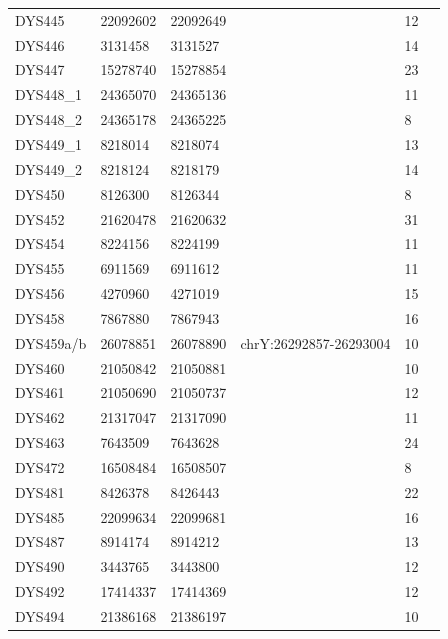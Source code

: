 \begin{tabularx}{\linewidth}{l l l l l l }
DYS445      & 22092602 & 22092649 &                        & 12 \\
DYS446      & 3131458  & 3131527  &                        & 14 \\
DYS447      & 15278740 & 15278854 &                        & 23 \\
DYS448\_1   & 24365070 & 24365136 &                        & 11 \\
DYS448\_2   & 24365178 & 24365225 &                        & 8  \\
DYS449\_1   & 8218014  & 8218074  &                        & 13 \\
DYS449\_2   & 8218124  & 8218179  &                        & 14 \\
DYS450      & 8126300  & 8126344  &                        & 8  \\
DYS452      & 21620478 & 21620632 &                        & 31 \\
DYS454      & 8224156  & 8224199  &                        & 11 \\
DYS455      & 6911569  & 6911612  &                        & 11 \\
DYS456      & 4270960  & 4271019  &                        & 15 \\
DYS458      & 7867880  & 7867943  &                        & 16 \\
DYS459a/b   & 26078851 & 26078890 & chrY:26292857-26293004 & 10 \\
DYS460      & 21050842 & 21050881 &                        & 10 \\
DYS461      & 21050690 & 21050737 &                        & 12 \\
DYS462      & 21317047 & 21317090 &                        & 11 \\
DYS463      & 7643509  & 7643628  &                        & 24 \\
DYS472      & 16508484 & 16508507 &                        & 8  \\
DYS481      & 8426378  & 8426443  &                        & 22 \\
DYS485      & 22099634 & 22099681 &                        & 16 \\
DYS487      & 8914174  & 8914212  &                        & 13 \\
DYS490      & 3443765  & 3443800  &                        & 12 \\
DYS492      & 17414337 & 17414369 &                        & 12 \\
DYS494      & 21386168 & 21386197 &                        & 10 \\

\end{tabularx}
